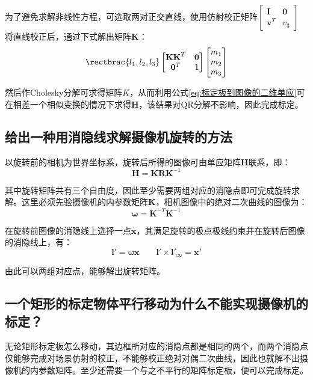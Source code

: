 \documentclass[11pt]{article}
\begin{document}
为了避免求解非线性方程，可选取两对正交直线，使用仿射校正矩阵$\begin{bmatrix}
  \mathbf{I}&\mathbf{0}\\
  \mathbf{v}^T&v_3
\end{bmatrix}$
将直线校正后，通过下式解出矩阵$\mathbf{K}$：
\begin{equation*}
  \rectbrac{l_1,l_2,l_3}\begin{bmatrix}
    \mathbf{KK}^T&\mathbf{0}\\
    \mathbf{0}^T&1
  \end{bmatrix}\begin{bmatrix}
    m_1\\
    m_2\\
    m_3
  \end{bmatrix}
\end{equation*}\par
然后作Cholesky分解可求得矩阵$K$，从而利用公式\ref{eq:标定板到图像的二维单应}可在相差一个相似变换的情况下求得$\mathbf{H}$，该结果对QR分解不影响，因此完成标定。
\subsection{给出一种用消隐线求解摄像机旋转的方法}
以旋转前的相机为世界坐标系，旋转后所得的图像可由单应矩阵$\mathbf{H}$联系，即：
\begin{equation*}
  \mathbf{H}=\mathbf{KRK}^{-1}
\end{equation*}\par
其中旋转矩阵共有三个自由度，因此至少需要两组对应的消隐点即可完成旋转求解。这里必须先验摄像机的内参数矩阵$\mathbf{K}$，相机图像中的绝对二次曲线的图像为：
\begin{equation*}
  \mathbold{\omega}=\mathbf{K}^{-T}\mathbf{K}^{-1}
\end{equation*}\par
在旋转前图像的消隐线上选择一点$\mathbf{x}$，其满足旋转的极点极线约束并在旋转后图像的消隐线上，有：
\begin{equation*}
  \mathbf{l}'=\mathbold{\omega x}\qquad\mathbf{l}'\times\mathbf{l'}_\infty=\mathbf{x'}
\end{equation*}\par
由此可以两组对应点，能够解出旋转矩阵。
\subsection{一个矩形的标定物体平行移动为什么不能实现摄像机的标定？}
无论矩形标定板怎么移动，其边框所对应的消隐点都是相同的两个，而两个消隐点仅能够完成对场景仿射的校正，不能够校正绝对对偶二次曲线，因此也就解不出摄像机的内参数矩阵。至少还需要一个与之不平行的矩阵标定板，便可以完成标定。
\end{document}
